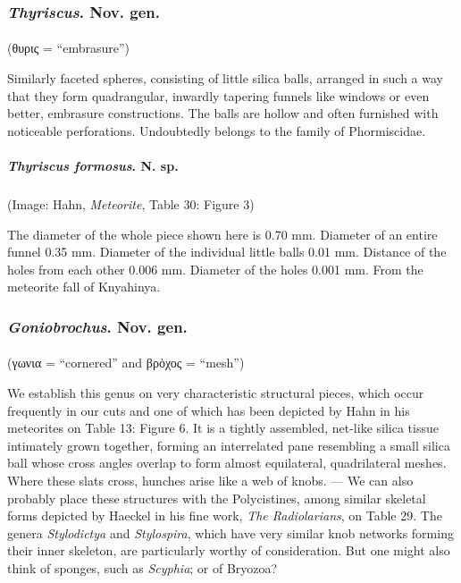 \documentclass[a4paper, 12pt, oneside]{article}
\begin{document}
\subsubsection{\emph{Thyriscus}. Nov. gen.}
\paragraph*{}
(θυρις = ``embrasure'')%

Similarly faceted spheres, consisting of little silica balls, arranged in such a way that they form quadrangular, inwardly tapering funnels like windows or even better, embrasure constructions. The balls are hollow and often furnished with noticeable perforations. Undoubtedly belongs to the family of Phormiscidae.
\paragraph{\emph{Thyriscus formosus}. N. sp.}
\subparagraph{}
(Image: Hahn, \emph{Meteorite}, Table 30: Figure 3)

The diameter of the whole piece shown here is 0.70 mm. Diameter of an entire funnel 0.35 mm. Diameter of the individual little balls 0.01 mm. Distance of the holes from each other 0.006 mm. Diameter of the holes 0.001 mm. From the meteorite fall of Knyahinya.
\subsubsection{\emph{Goniobrochus}. Nov. gen.}
\paragraph*{}
(γωνια = ``cornered'' and βρὁχος = ``mesh'')%

We establish this genus on very characteristic structural pieces, which occur frequently in our cuts and one of which has been depicted by Hahn in his meteorites on Table 13: Figure 6. It is a tightly assembled, net-like silica tissue intimately grown together, forming an interrelated pane resembling a small silica ball whose cross angles overlap to form almost equilateral, quadrilateral meshes. Where these slats cross, hunches arise like a web of knobs. --- We can also probably place these structures with the Polycistines, among similar skeletal forms depicted by Haeckel in his fine work, \emph{The Radiolarians}, on Table 29. The genera \emph{Stylodictya} and \emph{Stylospira}, which have very similar knob networks forming their inner skeleton, are particularly worthy of consideration. But one might also think of sponges, such as \emph{Scyphia}; or of Bryozoa?
\end{document}
